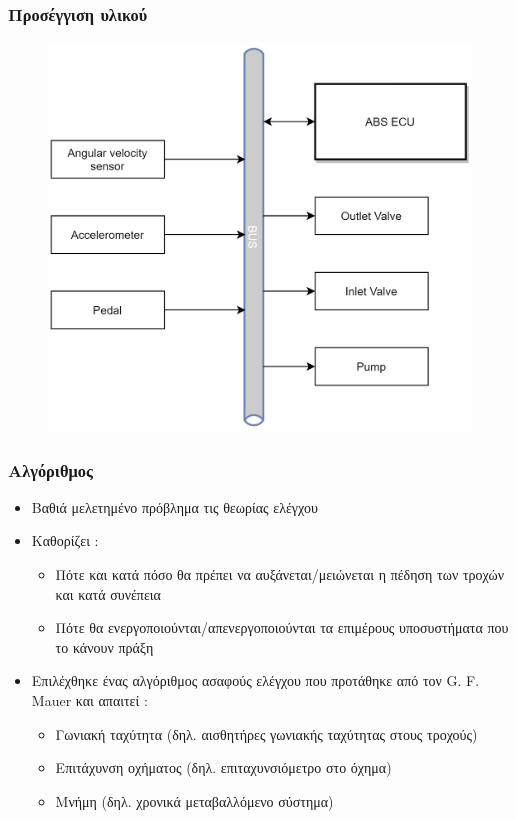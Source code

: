 \documentclass[fleqn]{beamer}
\begin{document}
\begin{frame}
  \frametitle{Προσέγγιση υλικού}
  \begin{figure}[H]
    \begin{center}
    \includegraphics[scale=0.15]{images/hardware-architecture-preview.png}
    \end{center}
\end{figure}
\end{frame}

\begin{frame}
  \frametitle{Αλγόριθμος}
  \begin{itemize}
  \item Βαθιά μελετημένο πρόβλημα τις θεωρίας ελέγχου
  \item Καθορίζει :
  \begin{itemize}
      \item Πότε και κατά πόσο θα πρέπει να αυξάνεται/μειώνεται η πέδηση των τροχών και κατά συνέπεια 
      \item Πότε θα ενεργοποιούνται/απενεργοποιούνται τα επιμέρους υποσυστήματα που το κάνουν πράξη
  \end{itemize}
  \item Επιλέχθηκε ένας αλγόριθμος ασαφούς ελέγχου που προτάθηκε από τον G. F. Mauer και απαιτεί :
  \begin{itemize}
    \item Γωνιακή ταχύτητα (δηλ. αισθητήρες γωνιακής ταχύτητας στους τροχούς)
    \item Επιτάχυνση οχήματος (δηλ. επιταχυνσιόμετρο στο όχημα)
    \item Μνήμη (δηλ. χρονικά μεταβαλλόμενο σύστημα)
  \end{itemize}
  
  \end{itemize}
\end{frame}
\end{document}
